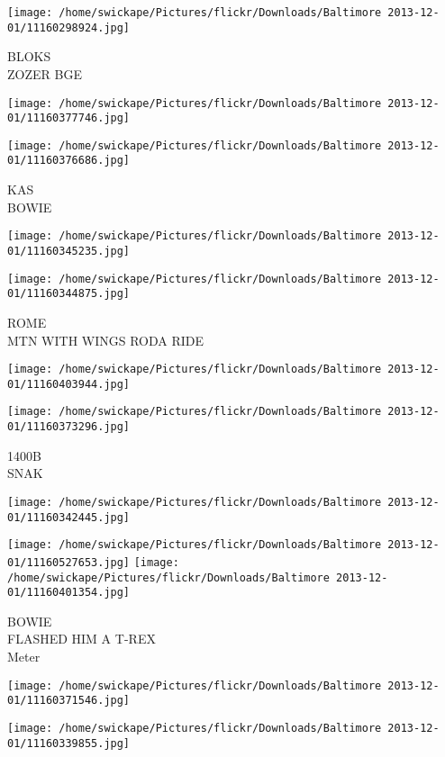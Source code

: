 \documentclass[10pt,letterpaper]{article}
\begin{document}
\vspace{0.25in}
\texttt{[image: /home/swickape/Pictures/flickr/Downloads/Baltimore 2013-12-01/11160298924.jpg]}

BLOKS\\
ZOZER BGE
\pagebreak

\texttt{[image: /home/swickape/Pictures/flickr/Downloads/Baltimore 2013-12-01/11160377746.jpg]}

\vspace{0.25in}
\texttt{[image: /home/swickape/Pictures/flickr/Downloads/Baltimore 2013-12-01/11160376686.jpg]}

KAS\\
BOWIE
\pagebreak

\texttt{[image: /home/swickape/Pictures/flickr/Downloads/Baltimore 2013-12-01/11160345235.jpg]}

\vspace{0.25in}
\texttt{[image: /home/swickape/Pictures/flickr/Downloads/Baltimore 2013-12-01/11160344875.jpg]}

ROME\\
MTN WITH WINGS RODA RIDE
\pagebreak

\texttt{[image: /home/swickape/Pictures/flickr/Downloads/Baltimore 2013-12-01/11160403944.jpg]}

\vspace{0.25in}
\texttt{[image: /home/swickape/Pictures/flickr/Downloads/Baltimore 2013-12-01/11160373296.jpg]}

1400B\\
SNAK
\pagebreak

\texttt{[image: /home/swickape/Pictures/flickr/Downloads/Baltimore 2013-12-01/11160342445.jpg]}

\vspace{0.25in}
\texttt{[image: /home/swickape/Pictures/flickr/Downloads/Baltimore 2013-12-01/11160527653.jpg]}
\texttt{[image: /home/swickape/Pictures/flickr/Downloads/Baltimore 2013-12-01/11160401354.jpg]}

BOWIE\\
FLASHED HIM A T{-}REX\\
Meter
\pagebreak

\texttt{[image: /home/swickape/Pictures/flickr/Downloads/Baltimore 2013-12-01/11160371546.jpg]}

\vspace{0.25in}
\texttt{[image: /home/swickape/Pictures/flickr/Downloads/Baltimore 2013-12-01/11160339855.jpg]}
\end{document}
